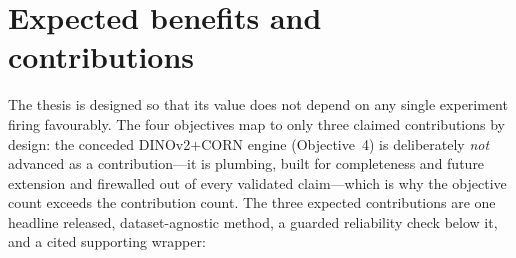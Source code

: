 \section{Expected benefits and contributions}
\label{sec:intro-contributions}

The thesis is designed so that its value does not depend on any single experiment
firing favourably. The four objectives map to only three claimed contributions
by design: the conceded DINOv2$+$CORN engine (Objective~4) is deliberately
\emph{not} advanced as a contribution---it is plumbing, built for completeness
and future extension and firewalled out of every validated claim---which is why
the objective count exceeds the contribution count. The three expected
contributions are one headline released, dataset-agnostic method, a guarded
reliability check below it, and a cited supporting wrapper:


